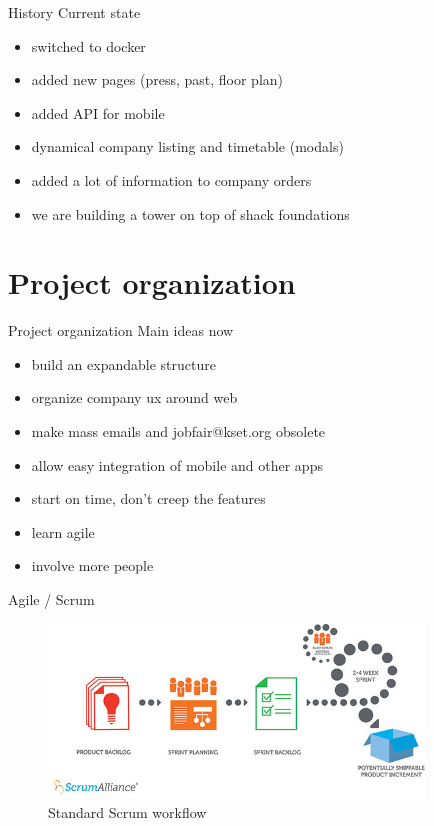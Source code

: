 \documentclass{beamer}
\begin{document}
	\begin{frame}{History}
		Current state
		\begin{itemize}
			\item switched to docker
			\item added new pages (press, past, floor plan)
			\item added API for mobile
			\item dynamical company listing and timetable (modals)
			\item added a lot of information to company orders
			\item we are building a tower on top of shack foundations
		\end{itemize}
	\end{frame}

	\section{Project organization}
	
	\begin{frame}{Project organization}
		Main ideas now
		\begin{itemize}
			\item build an expandable structure
			\item organize company ux around web
			\item make mass emails and jobfair@kset.org obsolete
			\item allow easy integration of mobile and other apps
			\item start on time, don't creep the features
			\item learn agile
			\item involve more people
		\end{itemize}
	\end{frame}

	\begin{frame}{Agile / Scrum}
		\begin{figure}
			\includegraphics[width=10cm]{scrum}
			\caption{Standard Scrum workflow}
		\end{figure}
	\end{frame}
\end{document}
